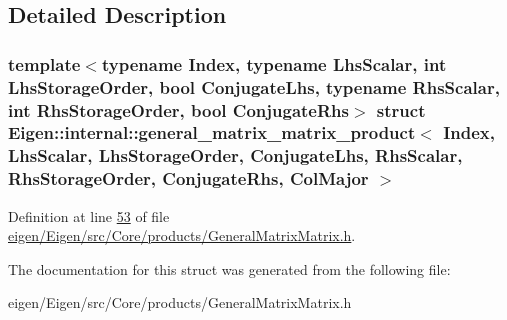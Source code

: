 \subsection{Detailed Description}
\subsubsection*{template$<$typename Index, typename Lhs\+Scalar, int Lhs\+Storage\+Order, bool Conjugate\+Lhs, typename Rhs\+Scalar, int Rhs\+Storage\+Order, bool Conjugate\+Rhs$>$\newline
struct Eigen\+::internal\+::general\+\_\+matrix\+\_\+matrix\+\_\+product$<$ Index, Lhs\+Scalar, Lhs\+Storage\+Order, Conjugate\+Lhs, Rhs\+Scalar, Rhs\+Storage\+Order, Conjugate\+Rhs, Col\+Major $>$}



Definition at line \hyperlink{eigen_2_eigen_2src_2_core_2products_2_general_matrix_matrix_8h_source_l00053}{53} of file \hyperlink{eigen_2_eigen_2src_2_core_2products_2_general_matrix_matrix_8h_source}{eigen/\+Eigen/src/\+Core/products/\+General\+Matrix\+Matrix.\+h}.



The documentation for this struct was generated from the following file\+:\begin{DoxyCompactItemize}
\item 
eigen/\+Eigen/src/\+Core/products/\+General\+Matrix\+Matrix.\+h\end{DoxyCompactItemize}
